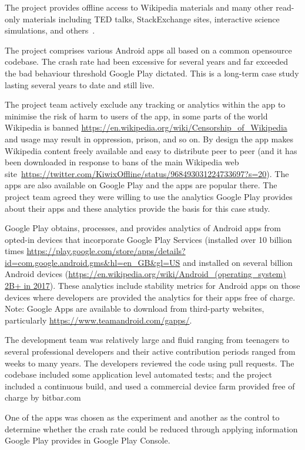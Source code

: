 The project provides offline access to Wikipedia materials and many other read-only materials including TED talks, StackExchange sites, interactive science simulations, and others~\citep{kiwix_about_the_project, gomez2017_wikimedia_kiwix_article}. 

The project comprises various Android apps all based on a common opensource codebase. The crash rate had been excessive for several years and far exceeded the bad behaviour threshold Google Play dictated. This is a long-term case study lasting several years to date and still live.

The project team actively exclude any tracking or analytics within the app to minimise the risk of harm to users of the app, in some parts of the world Wikipedia is banned \url{https://en.wikipedia.org/wiki/Censorship\_of\_Wikipedia} and usage may result in oppression, prison, and so on. By design the app makes Wikipedia content freely available and easy to distribute peer to peer (and it has been downloaded in response to bans of the main Wikipedia web site~\url{https://twitter.com/KiwixOffline/status/968493031224733697?s=20}). The apps are also available on Google Play and the apps are popular there. The project team agreed they were willing to use the analytics Google Play provides about their apps and these analytics provide the basis for this case study.

Google Play obtains, processes, and provides analytics of Android apps from opted-in devices that incorporate Google Play Services (installed over 10 billion times \url{https://play.google.com/store/apps/details?id=com.google.android.gms&hl=en\_GB&gl=US} and installed on several billion Android devices (\url{https://en.wikipedia.org/wiki/Android_(operating_system) 2B+ in 2017}). These analytics include stability metrics for Android apps on those devices where developers are provided the analytics for their apps free of charge.
Note: Google Apps are available to download from third-party websites, particularly \url{https://www.teamandroid.com/gapps/}. 


The development team was relatively large and fluid ranging from teenagers to several professional developers and their active contribution periods ranged from weeks to many years. The developers reviewed the code using pull requests.  The codebase included some application level automated tests; and the project included a continuous build, and used a commercial device farm provided free of charge by bitbar.com 

One of the apps was chosen as the experiment and another as the control to determine whether the crash rate could be reduced through applying information Google Play provides in Google Play Console.

